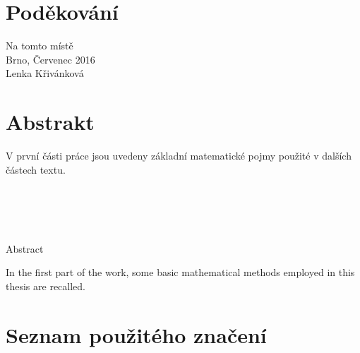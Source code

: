 \documentclass[a4paper,12pt]{report}
\theoremstyle{definition} \newtheorem{definice}[veta]{Definice}
\theoremstyle{remark}
\begin{document}
\chapter*{Poděkování}
\pagestyle{plain}
Na tomto místě
\\

Brno, Červenec 2016
\\

Lenka Křivánková

\chapter*{Abstrakt}
V první části práce jsou uvedeny základní matematické pojmy použité v dalších částech textu. 
\\\\\\\\\\

\begin{flushright} {{\Huge Abstract}} \vspace{38pt} \end{flushright}
In the first part of the work, some basic mathematical methods employed in this thesis are recalled. 

\tableofcontents {}

\chapter*{Seznam použitého značení} 
\end{document}
